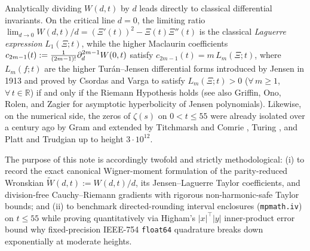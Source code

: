 \documentclass[11pt,a4paper,reqno]{amsart}
\theoremstyle{definition}
\theoremstyle{remark}
\numberwithin{equation}{section}
\newcommand{\Wtil}{\widetilde{W}}
\newcommand{\fac}{\mathclose{\mathchar"0021}}
\begin{document}
Analytically dividing $W(d,t)$ by $d$ leads directly to classical differential invariants. On the critical line $d = 0$, the limiting ratio $\lim_{d\to 0} W(d,t)/d = (\Xi'(t))^2 - \Xi(t)\Xi''(t)$ is the classical \emph{Laguerre expression} $L_1(\Xi;t)$, while the higher Maclaurin coefficients $c_{2m-1}(t) := \frac{1}{(2m-1)\fac}\partial_d^{2m-1}W(0,t)$ satisfy $c_{2m-1}(t) = m\,L_m(\Xi;t)$, where $L_m(f;t)$ are the higher Tur\'an--Jensen differential forms introduced by Jensen \cite{Jensen1913} in 1913 and proved by Csordas and Varga \cite{CsordasVarga1990} to satisfy $L_m(\Xi;t) > 0$ ($\forall\,m \ge 1$, $\forall\,t \in \mathbb{R}$) if and only if the Riemann Hypothesis holds (see also Griffin, Ono, Rolen, and Zagier \cite{Griffin2019} for asymptotic hyperbolicity of Jensen polynomials). Likewise, on the numerical side, the zeros of $\zeta(s)$ on $0 < t \le 55$ were already isolated over a century ago by Gram \cite{Gram1903} and extended by Titchmarsh and Comrie \cite{TitchmarshComrie1936}, Turing \cite{Turing1953}, and Platt and Trudgian \cite{PlattTrudgian2021} up to height $3 \cdot 10^{12}$.

The purpose of this note is accordingly twofold and strictly methodological: (i) to record the exact canonical Wigner-moment formulation of the parity-reduced Wronskian $\Wtil(d,t) := W(d,t)/d$, its Jensen--Laguerre Taylor coefficients, and division-free Cauchy--Riemann gradients with rigorous non-harmonic-safe Taylor bounds; and (ii) to benchmark directed-rounding interval enclosures (\texttt{mpmath.iv}) on $t \le 55$ while proving quantitatively via Higham's $|x|^\top|y|$ inner-product error bound why fixed-precision IEEE-754 \texttt{float64} quadrature breaks down exponentially at moderate heights.
\end{document}
